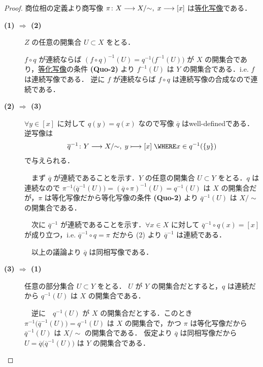 \documentclass[algtopo_main]{subfiles}
\begin{document}
\begin{proof}
    商位相の定義より商写像 $\pi \colon X \longrightarrow X / {\sim},\; x \longrightarrow [x]$ は\hyperref[def:quotient-map]{等化写像}である．
    \begin{description}
        \item[\textbf{(1) $\bm{\Longrightarrow}$ (2)}] $Z$ の任意の開集合 $U \subset X$ をとる．
        
        $f \circ q$ が連続ならば $(f \circ q)^{-1}(U) = q^{-1} \bigl( f^{-1}(U) \bigr)$ が $X$ の開集合であり，\hyperref[def:quotient-map]{等化写像}の条件 \textbf{\textsf{(Quo-2)}} より $f^{-1}(U)$ は $Y$ の開集合である．i.e. $f$ は連続写像である．
        逆に $f$ が連続ならば $f \circ q$ は連続写像の合成なので連続である．
        \item[\textbf{(2) $\bm{\Longrightarrow}$ (3)}] 
        $\forall y \in [x]$ に対して $q(y) = q(x)$ なので写像 $\overline{q}$ はwell-definedである．
        逆写像は 
        \begin{align}
            \overline{q}^{-1} \colon Y \lto X/{\sim},\; y \lmto [x]\; \WHERE x \in q^{-1}(\{y\})
        \end{align}
        で与えられる．
        
        　まず $\overline{q}$ が連続であることを示す．$Y$ の任意の開集合 $U \subset Y$ をとる．$q$ は連続なので $\pi^{-1} \bigl( \overline{q}^{-1}(U) \bigr) = (\overline{q} \circ \pi)^{-1}(U) = q^{-1}(U)$ は $X$ の開集合だが，$\pi$ は等化写像だから等化写像の条件 \textbf{\textsf{(Quo-2)}} より $\overline{q}^{-1}(U)$ は $X/{\sim}$ の開集合である．
        
        　次に $\overline{q}^{-1}$ が連続であることを示す．$\forall x \in X$ に対して $\overline{q}^{-1} \circ q(x) = [x]$ が成り立つ，i.e. $\overline{q}^{-1} \circ q = \pi$ だから (2) より $\overline{q}^{-1}$ は連続である．

        　以上の議論より $\overline{q}$ は同相写像である．
        \item[\textbf{(3) $\bm{\Longrightarrow}$ (1)}] 任意の部分集合 $U \subset Y$ をとる．
        $U$ が $Y$ の開集合だとすると，$q$ は連続だから $q^{-1}(U)$ は $X$ の開集合である．

        　逆に　$q^{-1}(U)$ が $X$ の開集合だとする．このとき $\pi^{-1} \bigl( \overline{q}^{-1}(U) \bigr) = q^{-1}(U)$ は $X$ の開集合で，かつ $\pi$ は等化写像だから $\overline{q}^{-1}(U)$ は $X/{\sim}$ の開集合である．
        仮定より $\overline{q}$ は同相写像だから $U = \overline{q} \bigl( \overline{q}^{-1}(U) \bigr)$ は $Y$ の開集合である．
    \end{description}
    
\end{proof}
\end{document}
